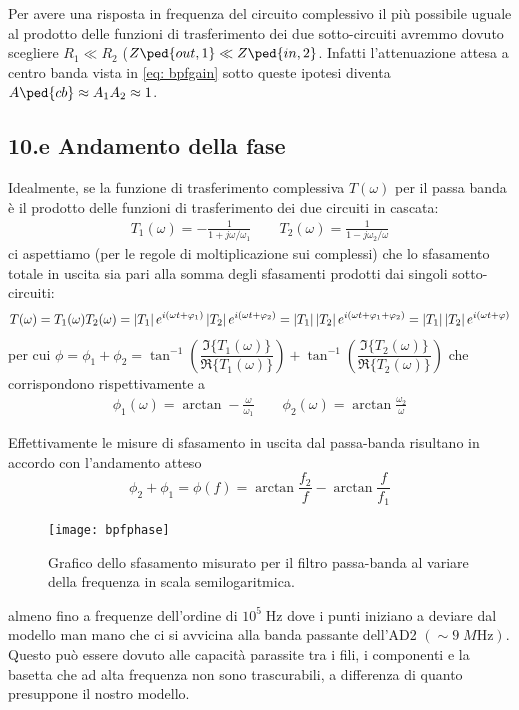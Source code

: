 \documentclass[10pt,a4paper]{article}
\begin{document}
Per avere una risposta in frequenza del circuito complessivo il più possibile
uguale al prodotto delle funzioni di trasferimento dei due sotto-circuiti
avremmo dovuto scegliere $R_1 \ll R_2$ ($Z\ped{out, 1} \ll Z\ped{in, 2}$.
Infatti l'attenuazione attesa a centro banda vista in \eqref{eq: bpfgain}
sotto queste ipotesi diventa $A\ped{cb} \approx A_1 A_2 \approx 1$.
\subsection*{10.e Andamento della fase}
Idealmente, se la funzione di trasferimento complessiva $T(\omega)$ per il
passa banda è il prodotto delle funzioni di trasferimento dei due circuiti in
cascata:
\begin{align*}
T_1(\omega) = -\frac{1}{1 + j \omega/\omega_1} \qquad
T_2(\omega) = \frac{1}{1 - j \omega_2/\omega}
\end{align*}
ci aspettiamo (per le regole di moltiplicazione sui complessi) che lo
sfasamento totale in uscita sia pari alla somma degli sfasamenti prodotti dai
singoli sotto-circuiti:
\[
T(\omega) = T_1(\omega) T_2(\omega) =
\left| T_1 \right| e^{i (\omega t + \varphi_1)} \left| T_2 \right| e^{i (\omega t + \varphi_2)} =
\left| T_1 \right| \left| T_2 \right| e^{i (\omega t + \varphi_1 + \varphi_2)} =
\left| T_1 \right| \left| T_2 \right| e^{i (\omega t + \varphi)}
\]
per cui $\phi = \phi_1 + \phi_2 =
\tan^{-1} \left( \dfrac{\Im{\{T_1(\omega)\}}}{\Re{\{T_1(\omega)\}}} \right) +
\tan^{-1} \left( \dfrac{\Im{\{T_2(\omega)\}}}{\Re{\{T_2(\omega)\}}} \right)$
che corrispondono rispettivamente a
\begin{align*}
\phi_1(\omega) = \arctan - \frac{\omega}{\omega_1} \qquad
\phi_2(\omega) = \arctan \frac{\omega_2}{\omega}
\end{align*}

Effettivamente le misure di sfasamento in uscita dal passa-banda risultano
in accordo con l'andamento atteso
\begin{equation}
\phi_2 + \phi_1 = \phi(f) = \arctan{\frac{f_2}{f}} - \arctan{\frac{f}{f_1}}
\end{equation}
\begin{figure}[htb]
\centering
\texttt{[image: bpfphase]}
\caption{Grafico dello sfasamento misurato per il filtro passa-banda al
variare della frequenza in scala semilogaritmica.}
\end{figure}
almeno fino a frequenze dell'ordine di $10^5 \; \si{\Hz}$ dove i punti
iniziano a deviare dal modello man mano che ci si avvicina alla banda
passante dell'AD2 $(\sim 9 \; \si{M\Hz})$. Questo può essere dovuto alle
capacità parassite tra i fili, i componenti e la basetta che ad alta
frequenza non sono trascurabili, a differenza di quanto presuppone il nostro
modello.
\fi
\end{document}

